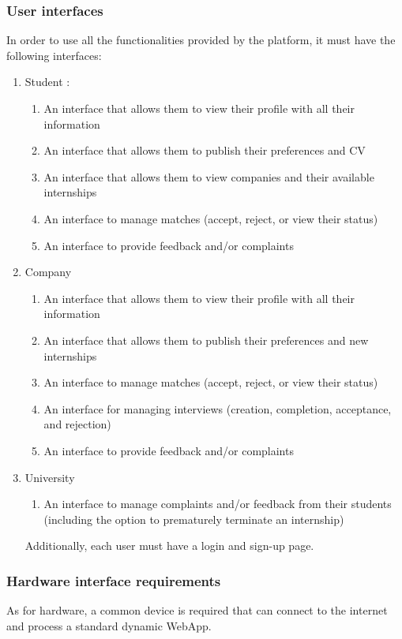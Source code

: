 \documentclass{article}
\begin{document}
\subsubsection{User interfaces }
In order to use all the functionalities provided by the platform, it must have the following interfaces:
\begin{enumerate}
    \item Student : 
    \begin{enumerate}
        \item An interface that allows them to view their profile with all their information
        \item An interface that allows them to publish their preferences and CV
        \item An interface that allows them to view companies and their available internships  
        \item An interface to manage matches (accept, reject, or view their status)
        \item An interface to provide feedback and/or complaints
    \end{enumerate}
    \item Company  
    \begin{enumerate}
        \item An interface that allows them to view their profile with all their information
        \item An interface that allows them to publish their preferences and new internships
        \item An interface to manage matches (accept, reject, or view their status)
        \item An interface for managing interviews (creation, completion, acceptance, and rejection)
        \item An interface to provide feedback and/or complaints
    \end{enumerate}
    \item University
    \begin{enumerate}
        \item An interface to manage complaints and/or feedback from their students (including the option to prematurely terminate an internship)
    \end{enumerate}
Additionally, each user must have a login and sign-up page.
\end{enumerate}

\subsubsection{Hardware interface requirements}
As for hardware, a common device is required that can connect to the internet and process a standard dynamic WebApp.
\end{document}
